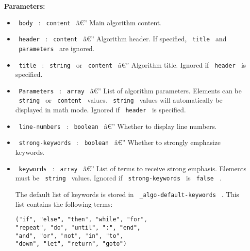 \textbf{Parameters:}

\begin{itemize}
\item
  \texttt{\ body\ } : \texttt{\ content\ } â€'' Main algorithm content.
\item
  \texttt{\ header\ } : \texttt{\ content\ } â€'' Algorithm header. If
  specified, \texttt{\ title\ } and \texttt{\ parameters\ } are ignored.
\item
  \texttt{\ title\ } : \texttt{\ string\ } or \texttt{\ content\ } â€''
  Algorithm title. Ignored if \texttt{\ header\ } is specified.
\item
  \texttt{\ Parameters\ } : \texttt{\ array\ } â€'' List of algorithm
  parameters. Elements can be \texttt{\ string\ } or
  \texttt{\ content\ } values. \texttt{\ string\ } values will
  automatically be displayed in math mode. Ignored if
  \texttt{\ header\ } is specified.
\item
  \texttt{\ line-numbers\ } : \texttt{\ boolean\ } â€'' Whether to
  display line numbers.
\item
  \texttt{\ strong-keywords\ } : \texttt{\ boolean\ } â€'' Whether to
  strongly emphasize keywords.
\item
  \texttt{\ keywords\ } : \texttt{\ array\ } â€'' List of terms to
  receive strong emphasis. Elements must be \texttt{\ string\ } values.
  Ignored if \texttt{\ strong-keywords\ } is \texttt{\ false\ } .

  The default list of keywords is stored in
  \texttt{\ \_algo-default-keywords\ } . This list contains the
  following terms:

\begin{verbatim}
("if", "else", "then", "while", "for",
"repeat", "do", "until", ":", "end",
"and", "or", "not", "in", "to",
"down", "let", "return", "goto")
\end{verbatim}


\end{itemize}
